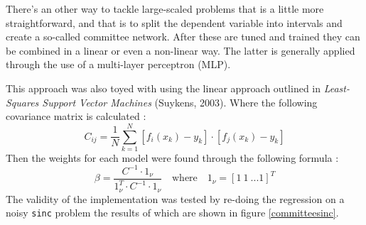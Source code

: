\par There's an other way to tackle large-scaled problems that is a little more straightforward, and that is to split the dependent variable into intervals and create a so-called committee network. After these are tuned and trained they can be combined in a linear or even a non-linear way. The latter is generally applied through the use of a multi-layer perceptron (MLP).

\par This approach was also toyed with using the linear approach outlined in \textit{Least-Squares Support Vector Machines} (Suykens, 2003). Where the following covariance matrix is calculated :
$$C_{ij}=\frac{1}{N}\sum_{k=1}^N[f_i(x_k)-y_k]\cdot[f_j(x_k)-y_k]$$
Then the weights for each model were found through the following formula : 
$$\beta = \frac{C^{-1}\cdot 1_{\nu}}{1_{\nu}^T\cdot C^{-1}\cdot 1_{\nu}}\quad\text{where}\quad 1_{\nu} = [1\ 1\ ... 1]^T$$
The validity of the implementation was tested by re-doing the regression on a noisy \texttt{sinc} problem the results of which are shown in figure \ref{committeesinc}.

\endgroup

